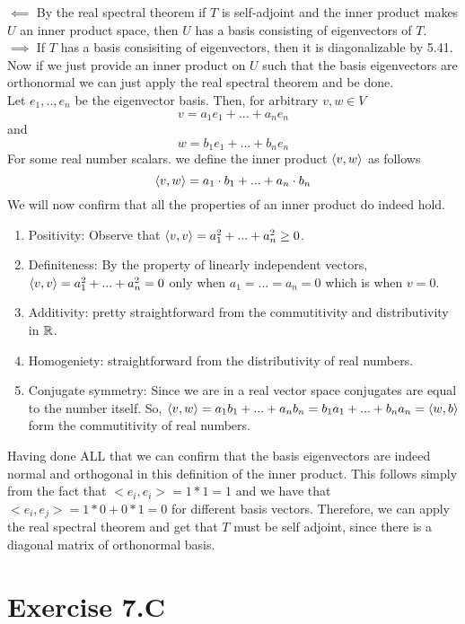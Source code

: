 \documentclass[10pt, twocolumn]{article}
\begin{document}
\begin{q}[14]
    $ \impliedby $ By the real spectral theorem if $ T $ is self-adjoint and the inner product makes $ U $ an inner product space, 
    then $ U $ has a basis consisting of eigenvectors of $ T $. \\
    $ \implies $ If $ T $ has a basis consisiting of eigenvectors, then it is diagonalizable by 5.41. 
    Now if we just provide an inner product on $ U $ such that the basis eigenvectors are orthonormal we can just apply the real spectral theorem and be done.\\
    Let $ e_1, .., e_n $ be the eigenvector basis. Then, for arbitrary $ v, w \in V $ 
    $$ v = a_1 e_1 + ... + a_n e_n $$
    and 
    $$ w = b_1 e_1 + ... + b_n e_n $$
    For some real number scalars.
    we define the inner product $ \langle v, w\rangle $ as follows 
    $$ \langle v, w\rangle = a_1 \cdot b_1 + ... + a_n \cdot b_n $$
    We will now confirm that all the properties of an inner product do indeed hold.
    \begin{enumerate}
        \item Positivity: Observe that $ \langle v, v\rangle = a_1^2 + ... + a_n^2 \geq 0 $.
        \item Definiteness: By the property of linearly independent vectors, 
        $ \langle v, v\rangle = a_1^2 + ... + a_n^2 = 0 $ only when $ a_1 = ... = a_n = 0 $ which is when $ v = 0 $.
        \item Additivity: pretty straightforward from the commutitivity and distributivity in $ \mathbb{R} $.
        \item Homogeniety: straightforward from the distributivity of real numbers.
        \item Conjugate symmetry: Since we are in a real vector space conjugates are equal to the number itself. 
        So, $ \langle v, w\rangle = a_1 b_1 + ... + a_n b_n = b_1 a_1 + ... + b_n a_n = \langle w, b\rangle $ form the commutitivity of real numbers.
    \end{enumerate}
    Having done ALL that we can confirm that the basis eigenvectors are indeed normal and orthogonal in this definition of the inner product.
    This follows simply from the fact that $ <e_i, e_i > = 1 * 1 = 1 $ and we have that  $ < e_i, e_j > = 1 * 0 + 0 * 1 = 0 $ for different basis vectors. 
    Therefore, we can apply the real spectral theorem and get that $ T $ must be self adjoint, since there is a diagonal matrix of orthonormal basis.
\end{q}

\section{Exercise 7.C}
\end{document}
